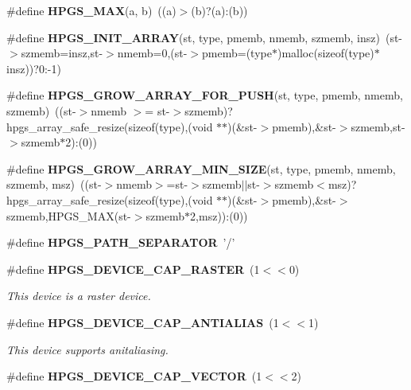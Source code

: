 \begin{DoxyCompactItemize}
\item 
\#define {\bfseries HPGS\_\-MAX}(a, b)~((a)$>$(b)?(a):(b))\label{group__base_gaec5d7d39582cda4657e55bc03d8e46b6}

\item 
\#define {\bfseries HPGS\_\-INIT\_\-ARRAY}(st, type, pmemb, nmemb, szmemb, insz)~(st-\/$>$szmemb=insz,st-\/$>$nmemb=0,(st-\/$>$pmemb=(type$\ast$)malloc(sizeof(type)$\ast$insz))?0:-\/1)\label{group__base_ga7c2f4a9472ff7fbb4bc8ae03dca95ee5}

\item 
\#define {\bfseries HPGS\_\-GROW\_\-ARRAY\_\-FOR\_\-PUSH}(st, type, pmemb, nmemb, szmemb)~((st-\/$>$nmemb $>$= st-\/$>$szmemb)?hpgs\_\-array\_\-safe\_\-resize(sizeof(type),(void $\ast$$\ast$)(\&st-\/$>$pmemb),\&st-\/$>$szmemb,st-\/$>$szmemb$\ast$2):(0))\label{group__base_ga517e12a0413b50a105931b08e38750cc}

\item 
\#define {\bfseries HPGS\_\-GROW\_\-ARRAY\_\-MIN\_\-SIZE}(st, type, pmemb, nmemb, szmemb, msz)~((st-\/$>$nmemb$>$=st-\/$>$szmemb$|$$|$st-\/$>$szmemb$<$msz)?hpgs\_\-array\_\-safe\_\-resize(sizeof(type),(void $\ast$$\ast$)(\&st-\/$>$pmemb),\&st-\/$>$szmemb,HPGS\_\-MAX(st-\/$>$szmemb$\ast$2,msz)):(0))\label{group__base_ga3d54bf84dedc8374eab4ff3d4f08cd97}

\item 
\#define {\bfseries HPGS\_\-PATH\_\-SEPARATOR}~'/'\label{group__base_ga844e792efbe234c04b5ecd4b23d5db9b}

\item 
\#define {\bf HPGS\_\-DEVICE\_\-CAP\_\-RASTER}~(1$<$$<$0)\label{group__device_ga8175e4398fb6e52394c50e931f8cf693}

\begin{DoxyCompactList}\small\item\em This device is a raster device. \item\end{DoxyCompactList}\item 
\#define {\bf HPGS\_\-DEVICE\_\-CAP\_\-ANTIALIAS}~(1$<$$<$1)\label{group__device_gabfbaca61af5c0e6faef1ad7a562f3329}

\begin{DoxyCompactList}\small\item\em This device supports anitaliasing. \item\end{DoxyCompactList}\item 
\#define {\bf HPGS\_\-DEVICE\_\-CAP\_\-VECTOR}~(1$<$$<$2)\label{group__device_ga83df9d5e409b8b6c76d218cac0a6e0a1}


\end{DoxyCompactItemize}
